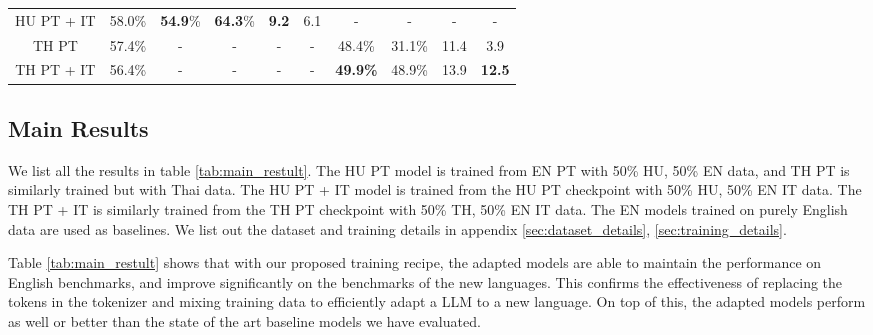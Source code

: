 {\begin{table}[]
\begin{adjustbox}{max width=\textwidth}
\begin{tabular}{ccccllllll}
HU PT + IT           & 58.0\%              & \textbf{54.9}\%              & \textbf{64.3}\%              & \multicolumn{1}{c}{\textbf{9.2}}         & \multicolumn{1}{c}{6.1}       &  \multicolumn{1}{c}{-}                                & \multicolumn{1}{c}{-}                                    & \multicolumn{1}{c}{-}                                   & \multicolumn{1}{c}{-}                                 \\
TH PT                & 57.4\% & \multicolumn{1}{c}{-}   & \multicolumn{1}{c}{-}  &  \multicolumn{1}{c}{-}                                   & \multicolumn{1}{c}{-}                          & \multicolumn{1}{c}{48.4\%}  & \multicolumn{1}{c}{31.1\%}                                 &                          \multicolumn{1}{c}{11.4}       &                        \multicolumn{1}{c}{3.9}                                \\
TH PT + IT          & 56.4\% & \multicolumn{1}{c}{-}   & \multicolumn{1}{c}{-}   & \multicolumn{1}{c}{-}                                     & \multicolumn{1}{c}{-}                                   &   \multicolumn{1}{c}{\textbf{49.9\%}}                             &     \multicolumn{1}{c}{48.9\%}                              &                      \multicolumn{1}{c}{13.9}             &            \multicolumn{1}{c}{\textbf{12.5}}                     \\
\bottomrule         
\end{tabular}
\end{adjustbox}
\end{table}

\subsection{Main Results}\label{main_results}
We list all the results in table \ref{tab:main_restult}. The HU PT model is trained from EN PT with 50\% HU, 50\% EN data, and TH PT is similarly trained but with Thai data. The HU PT + IT model is trained from the HU PT checkpoint with 50\% HU, 50\% EN IT data. The TH PT + IT is similarly trained from the TH PT checkpoint with 50\% TH, 50\% EN IT data. The EN models trained on purely English data are used as baselines. We list out the dataset and training details in appendix \ref{sec:dataset_details}, \ref{sec:training_details}.

Table \ref{tab:main_restult} shows that with our proposed training recipe, the adapted models are able to maintain the performance on English benchmarks, and improve significantly on the benchmarks of the new languages. This confirms the effectiveness of replacing the tokens in the tokenizer and mixing training data to efficiently adapt a LLM to a new language. On top of this, the adapted models perform as well or better than the state of the art baseline models we have evaluated. 


}
